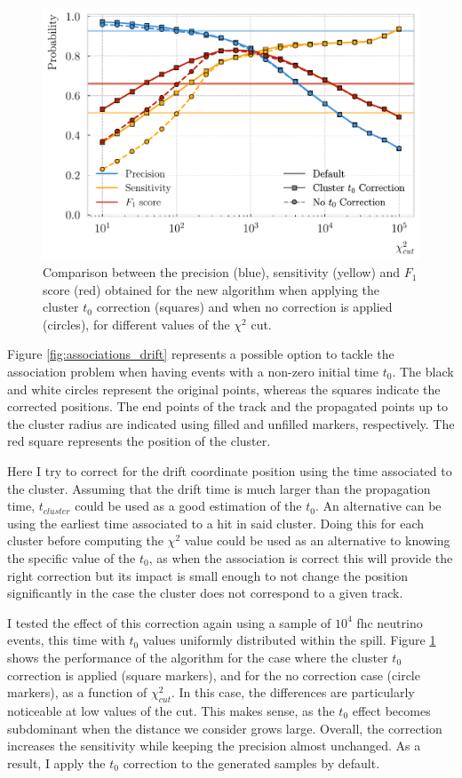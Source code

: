 \begin{figure}[t]
	\centering
	\includegraphics[width=.70\linewidth]{Images/GArSoft_PID/associations/helix_propagation_metrics_ecal.pdf}
	\caption[Performance of the new track-cluster association algorithm when applying the cluster $t_{0}$ correction for different values of the $\chi^{2}$ cut.]{Comparison between the precision (blue), sensitivity (yellow) and $F_{1}$ score (red) obtained for the new algorithm when applying the cluster $t_{0}$ correction (squares) and when no correction is applied (circles), for different values of the $\chi^{2}$ cut.}
	\label{fig:associations_t0_correction}
\end{figure}

Figure \ref{fig:associations_drift} represents a possible option to tackle the association problem when having events with a non-zero initial time $t_{0}$. The black and white circles represent the original points, whereas the squares indicate the corrected positions. The end points of the track and the propagated points up to the cluster radius are indicated using filled and unfilled markers, respectively. The red square represents the position of the cluster.

Here I try to correct for the drift coordinate position using the time associated to the cluster. Assuming that the drift time is much larger than the propagation time, $t_{cluster}$ could be used as a good estimation of the $t_{0}$. An alternative can be using the earliest time associated to a hit in said cluster. Doing this for each cluster before computing the $\chi^{2}$ value could be used as an alternative to knowing the specific value of the $t_{0}$, as when the association is correct this will provide the right correction but its impact is small enough to not change the position significantly in the case the cluster does not correspond to a given track.

I tested the effect of this correction again using a sample of $10^{4}$ \gls{fhc} neutrino events, this time with $t_{0}$ values uniformly distributed within the spill. Figure \ref{fig:associations_t0_correction} shows the performance of the algorithm for the case where the cluster $t_{0}$ correction is applied (square markers), and for the no correction case (circle markers), as a function of $\chi^{2}_{cut}$. In this case, the differences are particularly noticeable at low values of the cut. This makes sense, as the $t_{0}$ effect becomes subdominant when the distance we consider grows large. Overall, the correction increases the sensitivity while keeping the precision almost unchanged. As a result, I apply the $t_{0}$ correction to the generated samples by default.

